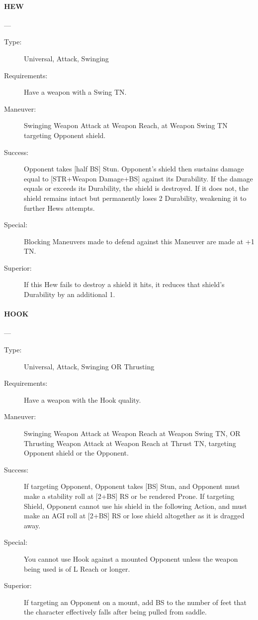 \documentclass[oneside,11pt,english]{book}
\begin{document}
\paragraph{\large\label{man:HEW} HEW}---\quad{\large[0]}
\vspace{-10pt}\begin{description} 
\item [Type:] Universal, Attack, Swinging 
\item [Requirements:] Have a weapon with a Swing TN. 
\item [Maneuver:] Swinging Weapon Attack at Weapon Reach, at Weapon Swing TN targeting Opponent shield.
\item [Success:] Opponent takes [half BS] Stun. Opponent’s shield then sustains damage equal to [STR+Weapon Damage+BS] against its Durability. If the damage equals or exceeds its Durability, the shield is destroyed. If it does not, the shield remains intact but permanently loses 2 Durability, weakening it to further Hews attempts.
\item [Special:] Blocking Maneuvers made to defend against this Maneuver are made at +1 TN. 
\item [Superior:] If this Hew fails to destroy a shield it hits, it reduces that shield’s Durability by an additional 1. 
\end{description}

\paragraph{\large\label{man:HOOK} HOOK}---\quad{\large[1]}
\vspace{-10pt}\begin{description} 
\item [Type:] Universal, Attack, Swinging OR Thrusting 
\item [Requirements:] Have a weapon with the Hook quality. 
\item [Maneuver:] Swinging Weapon Attack at Weapon Reach at Weapon Swing TN, OR Thrusting Weapon 
Attack at Weapon Reach at Thrust TN, targeting Opponent shield or the Opponent. 
\item [Success:] If targeting Opponent, Opponent takes [BS] Stun, and Opponent must make a stability roll at 
[2+BS] RS or be rendered Prone. 
If targeting Shield, Opponent cannot use his shield in the following Action, and must make an AGI roll at 
[2+BS] RS or lose shield altogether as it is dragged away. 
\item [Special:] You cannot use Hook against a mounted Opponent unless the weapon being used is of L Reach 
or longer. 
\item [Superior:] If targeting an Opponent on a mount, add BS to the number of feet that the character 
effectively falls after being pulled from saddle. 
\end{description}
\end{document}
